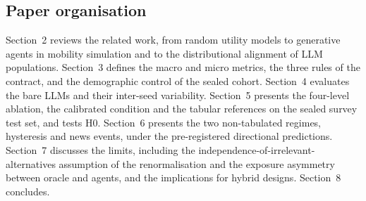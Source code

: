 \subsection{Paper organisation}

Section~2 reviews the related work, from random utility models to generative agents in mobility simulation and to the distributional alignment of LLM populations. Section~3 defines the macro and micro metrics, the three rules of the contract, and the demographic control of the sealed cohort. Section~4 evaluates the bare LLMs and their inter-seed variability. Section~5 presents the four-level ablation, the calibrated condition and the tabular references on the sealed survey test set, and tests H0. Section~6 presents the two non-tabulated regimes, hysteresis and news events, under the pre-registered directional predictions. Section~7 discusses the limits, including the independence-of-irrelevant-alternatives assumption of the renormalisation and the exposure asymmetry between oracle and agents, and the implications for hybrid designs. Section~8 concludes.
